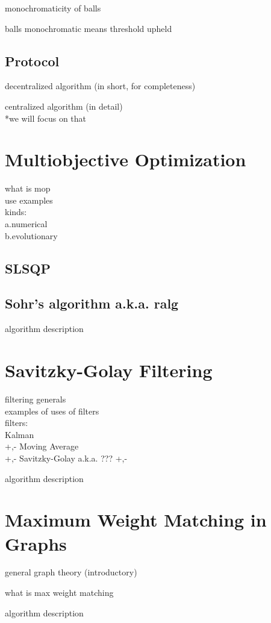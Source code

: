monochromaticity of balls

balls monochromatic means threshold upheld


\subsection{Protocol} \label{subsec:theorBack-GM-protocol}

decentralized algorithm (in short, for completeness)

centralized algorithm (in detail)\\
*we will focus on that


\section{Multiobjective Optimization} \label{sec:theorBack-MOP}

what is mop\\
use examples\\
kinds:\\
	a.numerical\\
	b.evolutionary
\subsection{SLSQP} \label{subsec:theorBack-SLSQP}

\subsection{Sohr's algorithm a.k.a. ralg} \label{subsec:theorBack-CONMIN}

algorithm description

\section{Savitzky-Golay Filtering} \label{sec:theorBack-SavitzkyGolay}

filtering generals\\
examples of uses of filters\\
filters:\\
	Kalman\\
		+,-
	Moving Average\\
		+,-
	Savitzky-Golay a.k.a. ???
		+,-

algorithm description

\section{Maximum Weight Matching in Graphs} \label{sec:theorBack-MWMGraphs}

general graph theory (introductory)

what is max weight matching

algorithm description
